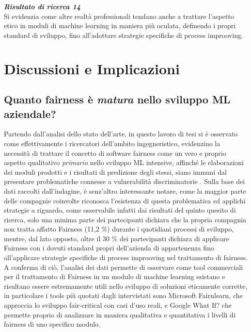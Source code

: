 	\begin{center}
	
        \begin{tcolorbox}[width=\textwidth, colframe=black, colback=Gray]
    			\begin{minipage}{\textwidth}
    				\textit{\faKey  \textbf{ Risultato di ricerca 14}}\\
    		     Si evidenzia come altre realtà professionali tendano anche a trattare l'aspetto etico in moduli di machine learning in maniera più oculata, definendo i propri standard di sviluppo, fino all'adottare strategie specifiche di process improoving.
    			\end{minipage}
		\end{tcolorbox}
	\end{center}

    
    
    \section{Discussioni e Implicazioni}
    
    \subsection{Quanto fairness è \emph{matura} nello sviluppo ML aziendale?}
    Partendo dall'analisi dello stato dell'arte, in questo lavoro di tesi si è osservato come effettivamente i ricercatori dell'ambito ingegneristico, evidenzino la necessità di trattare il concetto di software fairness come un vero e proprio aspetto qualitativo \emph{primario} nello sviluppo ML intensive, affinché le elaborazioni dei moduli prodotti e i risultati di predizione degli stessi, siano immuni dal presentare problematiche connesse a vulnerabilità discriminatorie \cite{brun2018software}. Sulla base dei dati raccolti dall'indagine, è senz'altro interessante notare, come la maggior parte delle compagnie coinvolte riconosca l'esistenza di questa problematica ed applichi strategie a riguardo, come osservabile infatti dai risultati del quinto quesito di ricerca, solo una minima parte dei partecipanti dichiara che la propria compagnia non tratta affatto Fairness (11,2 \%) durante i quotidiani processi di sviluppo, mentre, dal lato opposto, oltre il 30 \% dei partecipanti dichiara di 
    applicare Fairness con i dovuti standard propri dell'azienda di appartenenza fino all'applicare strategie specifiche di process improoving nel trattamento di fairness. A conferma di ciò, l'analisi dei dati permette di osservare come tool commerciali per il trattamento di Fairness in un modulo di machine learning esistano e risultano essere estremamente utili nello sviluppo di soluzioni eticamente corrette, in particolare i tools più quotati dagli intervistati sono  Microsoft Fairnlearn, che approccia lo sviluppo fair-critical con casi d'uso reali, e Google What If? che permette proprio di analizzare in maniera qualitativa e quantitativa i livelli di fairness di uno specifico modulo.\\
    

